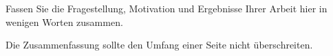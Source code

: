 Fassen Sie die Fragestellung, Motivation und Ergebnisse Ihrer Arbeit
hier in wenigen Worten zusammen.

Die Zusammenfassung sollte den Umfang einer Seite nicht überschreiten.
